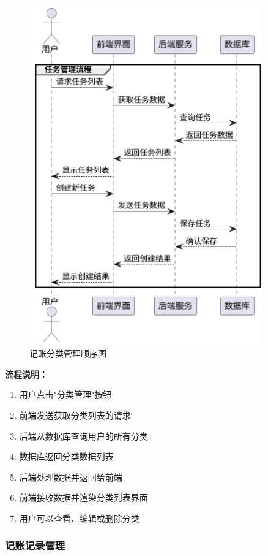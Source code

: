 \documentclass[a4paper]{article}
\begin{document}
\begin{figure}[H]
\centering
\includegraphics[width=0.9\textwidth]{img/sequence_diagram2.png}
\caption{记账分类管理顺序图}
\end{figure}

\textbf{流程说明：}

\begin{enumerate}
    \item 用户点击"分类管理"按钮
    \item 前端发送获取分类列表的请求
    \item 后端从数据库查询用户的所有分类
    \item 数据库返回分类数据列表
    \item 后端处理数据并返回给前端
    \item 前端接收数据并渲染分类列表界面
    \item 用户可以查看、编辑或删除分类
\end{enumerate}

\subsubsection{记账记录管理}
\end{document}
